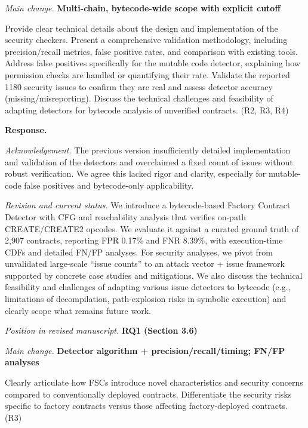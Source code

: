 \documentclass[acmsmall]{acmart}
\begin{document}
	\textit{Main change.} {\color{blue}\textbf{Multi-chain, bytecode-wide scope with explicit cutoff}}

	\begin{tcolorbox}
		[commentbox,title=Editor/AE -- Comment 2] Provide clear technical details about the design
		and implementation of the security checkers. Present a comprehensive validation methodology,
		including precision/recall metrics, false positive rates, and comparison with existing tools.
		Address false positives specifically for the mutable code detector, explaining how
		permission checks are handled or quantifying their rate. Validate the reported 1180 security
		issues to confirm they are real and assess detector accuracy (missing/misreporting). Discuss
		the technical challenges and feasibility of adapting detectors for bytecode analysis of
		unverified contracts. (R2, R3, R4)
	\end{tcolorbox}

	\noindent
	\textbf{Response.}

	\textit{Acknowledgement.} The previous version insufficiently detailed implementation and
	validation of the detectors and overclaimed a fixed count of issues without robust verification.
	We agree this lacked rigor and clarity, especially for mutable-code false positives and bytecode-only
	applicability.

	\textit{Revision and current status.} We introduce a bytecode-based Factory Contract Detector with
	CFG and reachability analysis that verifies on-path CREATE/CREATE2 opcodes. We evaluate it
	against a curated ground truth of 2,907 contracts, reporting FPR 0.17\% and FNR 8.39\%, with
	execution-time CDFs and detailed FN/FP analyses. For security analyses, we pivot from
	unvalidated large-scale “issue counts” to an attack vector + issue framework supported by
	concrete case studies and mitigations. We also discuss the technical feasibility and challenges of
	adapting various issue detectors to bytecode (e.g., limitations of decompilation, path-explosion
	risks in symbolic execution) and clearly scope what remains future work.

	\vspace{0.25em}
	\textit{Position in revised manuscript.} {\color{red}\textbf{RQ1 (Section 3.6)}}

	\textit{Main change.} {\color{blue}\textbf{Detector algorithm + precision/recall/timing; FN/FP analyses}}

	\begin{tcolorbox}
		[commentbox,title=Editor/AE -- Comment 3] Clearly articulate how FSCs introduce novel
		characteristics and security concerns compared to conventionally deployed contracts. Differentiate
		the security risks specific to factory contracts versus those affecting factory-deployed contracts.
		(R3)
	\end{tcolorbox}
\end{document}
